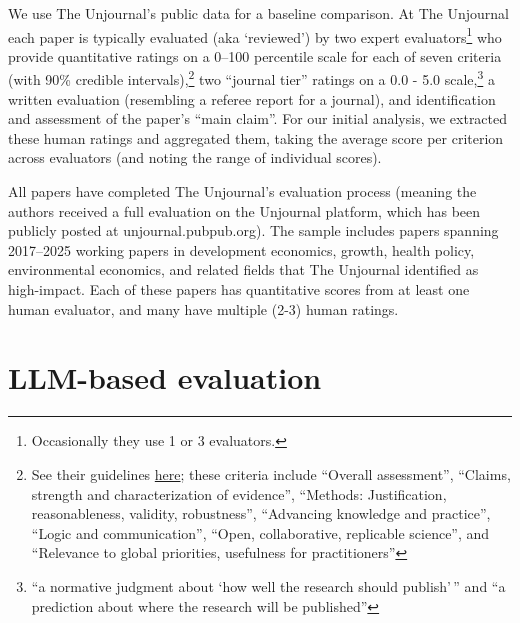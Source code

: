 \documentclass[
  11pt,
  letterpaper,
  DIV=11,
  numbers=noendperiod]{scrreprt}
\begin{document}
We use The Unjournal's public data for a baseline comparison. At The
Unjournal each paper is typically evaluated (aka `reviewed') by two
expert evaluators\footnote{Occasionally they use 1 or 3 evaluators.} who
provide quantitative ratings on a 0--100 percentile scale for each of
seven criteria (with 90\% credible intervals),\footnote{See their
  guidelines
  \href{https://globalimpact.gitbook.io/the-unjournal-project-and-communication-space/policies-projects-evaluation-workflow/evaluation/guidelines-for-evaluators\#quantitative-metrics}{here};
  these criteria include ``Overall assessment'', ``Claims, strength and
  characterization of evidence'', ``Methods: Justification,
  reasonableness, validity, robustness'', ``Advancing knowledge and
  practice'', ``Logic and communication'', ``Open, collaborative,
  replicable science'', and ``Relevance to global priorities, usefulness
  for practitioners''} two ``journal tier'' ratings on a 0.0 - 5.0
scale,\footnote{``a normative judgment about `how well the research
  should publish'\,'' and ``a prediction about where the research will
  be published''} a written evaluation (resembling a referee report for
a journal), and identification and assessment of the paper's ``main
claim''. For our initial analysis, we extracted these human ratings and
aggregated them, taking the average score per criterion across
evaluators (and noting the range of individual scores).

All papers have completed The Unjournal's evaluation process (meaning
the authors received a full evaluation on the Unjournal platform, which
has been publicly posted at unjournal.pubpub.org). The sample includes
papers spanning 2017--2025 working papers in development economics,
growth, health policy, environmental economics, and related fields that
The Unjournal identified as high-impact. Each of these papers has
quantitative scores from at least one human evaluator, and many have
multiple (2-3) human ratings.

\section{LLM-based evaluation}\label{llm-based-evaluation}
\end{document}
